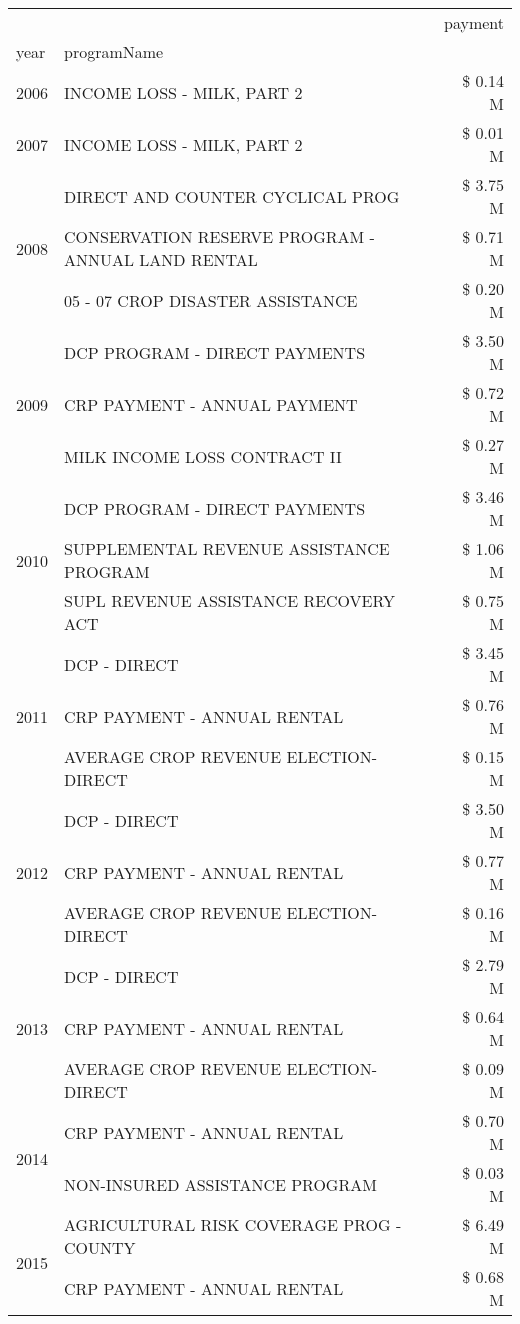 \begin{tabular}{llr}
\toprule
 &  & payment \\
year & programName &  \\
\midrule
2006 & INCOME LOSS - MILK, PART 2 & \$ 0.14 M \\
\cline{1-3}
2007 & INCOME LOSS - MILK, PART 2 & \$ 0.01 M \\
\cline{1-3}
\multirow[t]{3}{*}{2008} & DIRECT AND COUNTER CYCLICAL PROG & \$ 3.75 M \\
 & CONSERVATION RESERVE PROGRAM - ANNUAL LAND RENTAL & \$ 0.71 M \\
 & 05 - 07 CROP DISASTER ASSISTANCE & \$ 0.20 M \\
\cline{1-3}
\multirow[t]{3}{*}{2009} & DCP PROGRAM - DIRECT PAYMENTS & \$ 3.50 M \\
 & CRP PAYMENT - ANNUAL PAYMENT & \$ 0.72 M \\
 & MILK INCOME LOSS CONTRACT II & \$ 0.27 M \\
\cline{1-3}
\multirow[t]{3}{*}{2010} & DCP PROGRAM - DIRECT PAYMENTS & \$ 3.46 M \\
 & SUPPLEMENTAL REVENUE ASSISTANCE PROGRAM & \$ 1.06 M \\
 & SUPL REVENUE ASSISTANCE RECOVERY ACT & \$ 0.75 M \\
\cline{1-3}
\multirow[t]{3}{*}{2011} & DCP - DIRECT & \$ 3.45 M \\
 & CRP PAYMENT - ANNUAL RENTAL & \$ 0.76 M \\
 & AVERAGE CROP REVENUE ELECTION-DIRECT & \$ 0.15 M \\
\cline{1-3}
\multirow[t]{3}{*}{2012} & DCP - DIRECT & \$ 3.50 M \\
 & CRP PAYMENT - ANNUAL RENTAL & \$ 0.77 M \\
 & AVERAGE CROP REVENUE ELECTION-DIRECT & \$ 0.16 M \\
\cline{1-3}
\multirow[t]{3}{*}{2013} & DCP - DIRECT & \$ 2.79 M \\
 & CRP PAYMENT - ANNUAL RENTAL & \$ 0.64 M \\
 & AVERAGE CROP REVENUE ELECTION-DIRECT & \$ 0.09 M \\
\cline{1-3}
\multirow[t]{2}{*}{2014} & CRP PAYMENT - ANNUAL RENTAL & \$ 0.70 M \\
 & NON-INSURED ASSISTANCE PROGRAM & \$ 0.03 M \\
\cline{1-3}
\multirow[t]{3}{*}{2015} & AGRICULTURAL RISK COVERAGE PROG - COUNTY & \$ 6.49 M \\
 & CRP PAYMENT - ANNUAL RENTAL & \$ 0.68 M \\

\end{tabular}

